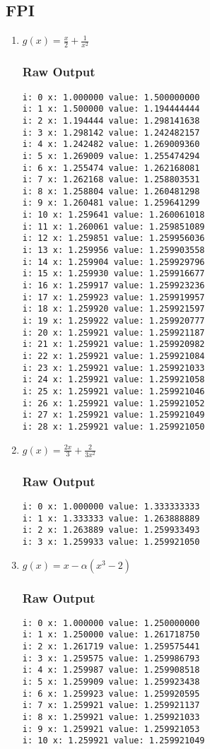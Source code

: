 \documentclass[11pt]{article} %
\begin{document}
\subsection*{FPI}
\begin{enumerate}
\item $g(x) = \frac{x}{2}+ \frac{1}{x^2}$
\subsubsection*{Raw Output}
\begin{verbatim}
i: 0 x: 1.000000 value: 1.500000000 
i: 1 x: 1.500000 value: 1.194444444 
i: 2 x: 1.194444 value: 1.298141638 
i: 3 x: 1.298142 value: 1.242482157 
i: 4 x: 1.242482 value: 1.269009360 
i: 5 x: 1.269009 value: 1.255474294 
i: 6 x: 1.255474 value: 1.262168081 
i: 7 x: 1.262168 value: 1.258803531 
i: 8 x: 1.258804 value: 1.260481298 
i: 9 x: 1.260481 value: 1.259641299 
i: 10 x: 1.259641 value: 1.260061018 
i: 11 x: 1.260061 value: 1.259851089 
i: 12 x: 1.259851 value: 1.259956036 
i: 13 x: 1.259956 value: 1.259903558 
i: 14 x: 1.259904 value: 1.259929796 
i: 15 x: 1.259930 value: 1.259916677 
i: 16 x: 1.259917 value: 1.259923236 
i: 17 x: 1.259923 value: 1.259919957 
i: 18 x: 1.259920 value: 1.259921597 
i: 19 x: 1.259922 value: 1.259920777 
i: 20 x: 1.259921 value: 1.259921187 
i: 21 x: 1.259921 value: 1.259920982 
i: 22 x: 1.259921 value: 1.259921084 
i: 23 x: 1.259921 value: 1.259921033 
i: 24 x: 1.259921 value: 1.259921058 
i: 25 x: 1.259921 value: 1.259921046 
i: 26 x: 1.259921 value: 1.259921052 
i: 27 x: 1.259921 value: 1.259921049 
i: 28 x: 1.259921 value: 1.259921050 
\end{verbatim}

\item $g(x) = \frac{2x}{3}+ \frac{2}{3x^2}$
\subsubsection*{Raw Output}
\begin{verbatim}
i: 0 x: 1.000000 value: 1.333333333
i: 1 x: 1.333333 value: 1.263888889
i: 2 x: 1.263889 value: 1.259933493
i: 3 x: 1.259933 value: 1.259921050
\end{verbatim}
\item $g(x) = x - \alpha(x^3 - 2)$
\subsubsection*{Raw Output}
\begin{verbatim}
i: 0 x: 1.000000 value: 1.250000000
i: 1 x: 1.250000 value: 1.261718750
i: 2 x: 1.261719 value: 1.259575441
i: 3 x: 1.259575 value: 1.259986793
i: 4 x: 1.259987 value: 1.259908518
i: 5 x: 1.259909 value: 1.259923438
i: 6 x: 1.259923 value: 1.259920595
i: 7 x: 1.259921 value: 1.259921137
i: 8 x: 1.259921 value: 1.259921033
i: 9 x: 1.259921 value: 1.259921053
i: 10 x: 1.259921 value: 1.259921049
\end{verbatim}
\end{enumerate}
\end{document}

